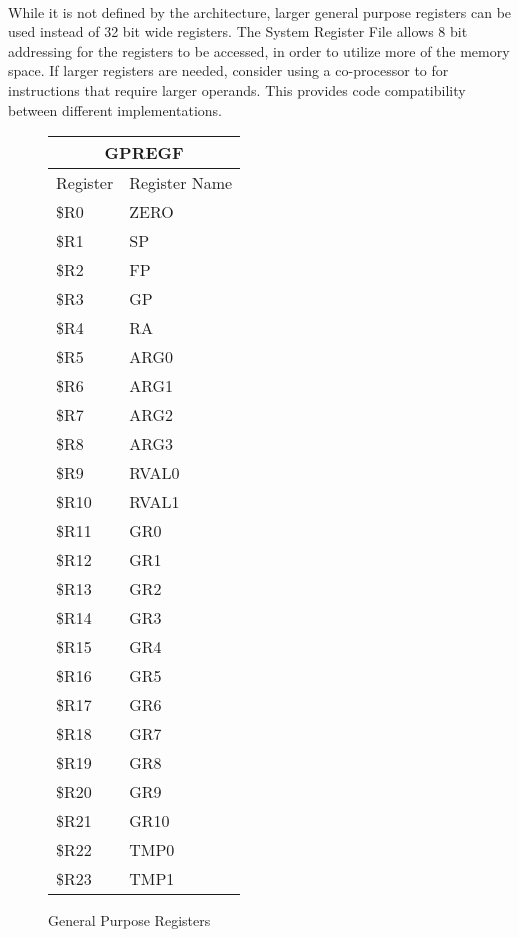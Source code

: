 \documentclass[letterpaper, 11pt]{article}
\begin{document}
\paragraph{}While it is not defined by the architecture, larger general purpose registers can be used instead of 32 bit wide registers. The System Register File allows 8 bit addressing for the registers to be accessed, in order to utilize more of the memory space.
If larger registers are needed, consider using a co-processor to for instructions that require larger operands. 
This provides code compatibility between different implementations.
\begin{figure}[!h]
	\caption{General Purpose Registers}
	\parbox{0.5\linewidth}{
		\centering
		\fontsize{10}{12}\selectfont
		\begin{tabular}{|l|l|}
			\hline
			\multicolumn{2}{|c|}{GPREGF} \\
			\hline
			Register & Register Name \\ \hline
			\$R0  & ZERO \\ 	\hline
			\$R1  & SP \\ 	\hline
			\$R2  & FP \\ 	\hline
			\$R3  & GP \\ 	\hline
			\$R4  & RA \\ 	\hline
			\$R5  & ARG0 \\ 	\hline
			\$R6  & ARG1 \\ 	\hline
			\$R7  & ARG2 \\ 	\hline
			\$R8  & ARG3 \\ 	\hline
			\$R9  & RVAL0 \\ 	\hline
			\$R10 & RVAL1 \\ \hline
			\$R11 & GR0  \\ \hline
			\$R12 & GR1  \\ \hline
			\$R13 & GR2  \\ \hline
			\$R14 & GR3  \\ \hline
			\$R15 & GR4  \\ \hline
			\$R16 & GR5  \\ \hline
			\$R17 & GR6  \\ \hline
			\$R18 & GR7  \\ \hline
			\$R19 & GR8  \\ \hline
			\$R20 & GR9  \\ \hline
			\$R21 & GR10  \\ \hline
			\$R22 & TMP0  \\ \hline
			\$R23 & TMP1 \\ \hline

\end{tabular}}
\end{figure}
\end{document}
